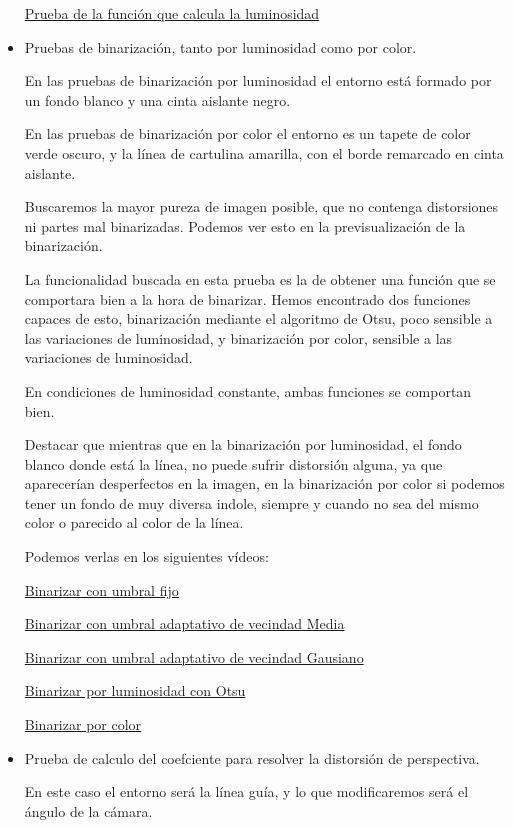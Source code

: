 \begin{itemize}
	\href{https://youtu.be/CuTADdioU4g}{Prueba de la función que calcula la luminosidad}	
	
	\item Pruebas de binarización, tanto por luminosidad como por color. 
	
	En las pruebas de binarización por luminosidad el entorno está formado por un fondo blanco y una cinta aislante negro.
	
En las pruebas de binarización por color el entorno es un tapete de color verde oscuro, y la línea de cartulina amarilla, con el borde remarcado en cinta aislante.

Buscaremos la mayor pureza de imagen posible, que no contenga
distorsiones ni partes mal binarizadas. Podemos ver esto en la previsualización de la binarización.

La funcionalidad buscada en esta prueba es la de obtener una función que se comportara bien a la hora de binarizar. Hemos encontrado dos funciones capaces de esto, binarización mediante el algoritmo de Otsu, poco sensible a las variaciones de luminosidad, y binarización por color, sensible a las variaciones de luminosidad.

En condiciones de luminosidad constante, ambas funciones se comportan bien.

Destacar que mientras que en la binarización por luminosidad, el fondo blanco donde está la línea, no puede sufrir distorsión alguna, ya que aparecerían desperfectos en la imagen, en la binarización por color si podemos tener un fondo de muy diversa indole, siempre y cuando no sea del mismo color o parecido al color de la línea.
	
	
	Podemos verlas en los siguientes vídeos:
	
	\href{https://youtu.be/Gu_HvPr3cCU}{Binarizar con umbral fijo}
	
	\href{https://youtu.be/NCWQ2I-1J_o}{Binarizar con umbral adaptativo de vecindad Media}
	
	\href{https://youtu.be/XPxqk3kNXKY}{Binarizar con umbral adaptativo de vecindad Gausiano}
	
	\href{https://youtu.be/4CW4r9qdo4Y}{Binarizar por luminosidad con Otsu}
	
	\href{https://youtu.be/Rks5PkxDeZQ}{Binarizar por color}
	
	\item Prueba de calculo del coefciente para resolver la distorsión de perspectiva. 
	
	En este caso el entorno será la línea guía, y lo que modificaremos será el ángulo de la cámara.
	

\end{itemize}
